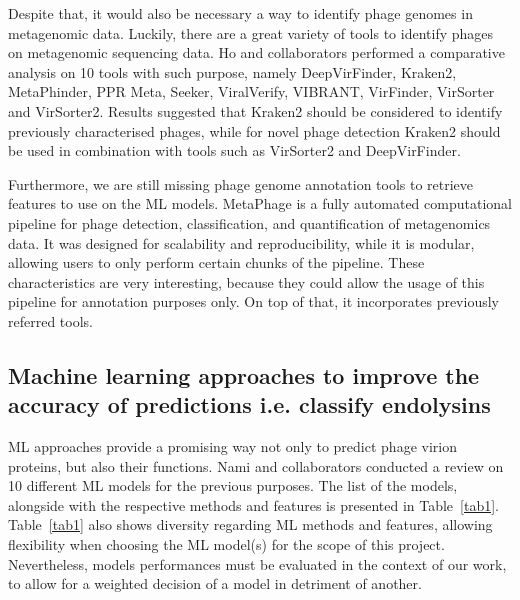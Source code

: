 \documentclass[runningheads]{llncs}
\begin{document}
Despite that, it would also be necessary a way to identify phage genomes in metagenomic data.
Luckily, there are a great variety of tools to identify phages on metagenomic sequencing data. Ho and collaborators performed a comparative analysis on 10 tools with such purpose, namely DeepVirFinder, Kraken2, MetaPhinder, PPR Meta, Seeker, ViralVerify, VIBRANT, VirFinder, VirSorter and VirSorter2. Results suggested that Kraken2 should be considered to identify previously characterised phages, while for novel phage detection Kraken2 should be used in combination with tools such as VirSorter2 and DeepVirFinder.

Furthermore, we are still missing phage genome annotation tools to retrieve features to use on the ML models. MetaPhage \cite{Pandolfo2022} is a fully automated computational pipeline for phage detection, classification, and quantification of metagenomics data. It was designed for scalability and reproducibility, while it is modular, allowing users to only perform certain chunks of the pipeline. These characteristics are very interesting, because they could allow the usage of this pipeline for annotation purposes only. On top of that, it incorporates previously referred tools.
%
\subsection{Machine learning approaches to improve the accuracy of predictions i.e. classify endolysins}
ML approaches provide a promising way not only to predict phage virion proteins, but also their functions.
Nami and collaborators \cite{Nami2021} conducted a review on 10 different ML models for the previous purposes. The list of the models, alongside with the respective methods and features is presented in Table~\ref{tab1}. Table~\ref{tab1} also shows diversity regarding ML methods and features, allowing flexibility when choosing the ML model(s) for the scope of this project. Nevertheless, models performances must be evaluated in the context of our work, to allow for a weighted decision of a model in detriment of another.
\end{document}
